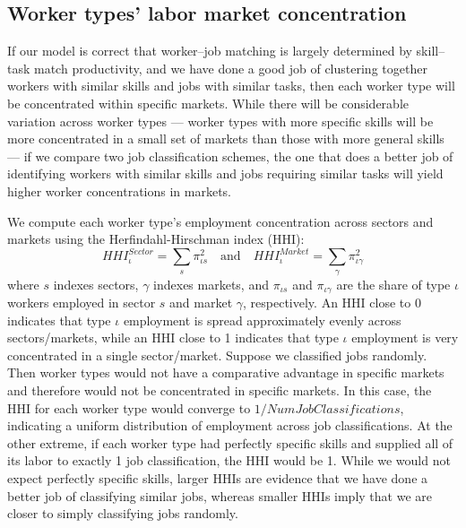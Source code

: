 \documentclass[12pt]{article}
\def\g{\gamma}
\def\i{\iota}
\theoremstyle{definition}
\theoremstyle{plain}
\begin{document}
\subsection{Worker types' labor market concentration}


\label{sec:hhi}

If our model is correct that worker--job matching is largely determined by skill--task match productivity, and we have done a good job of clustering together workers with similar skills and jobs with similar tasks, then each worker type will be concentrated within specific markets. While there will be considerable variation across worker types --- worker types with more specific skills will be more concentrated in a small set of markets than those with more general skills --- if we compare two job classification schemes, the one that does a better job of identifying workers with similar skills and jobs requiring similar tasks will yield higher worker concentrations in markets.


We compute each worker type's employment concentration across sectors and markets using the Herfindahl-Hirschman index (HHI): 
\[ HHI_{\i}^{Sector} = \sum_s \pi_{\i s}^2 \quad \text{and} \quad  HHI_{\i}^{Market} = \sum_\g \pi_{\i \g}^2 \]
where $s$ indexes sectors, $\g$ indexes markets, and $\pi_{\i s}$ and $\pi_{\i \g}$ are the share of type $\i$ workers employed in sector $s$ and market $\g$, respectively. An HHI close to 0 indicates that type $\i$ employment is spread approximately evenly across sectors/markets, while an HHI close to 1 indicates that type $\i$ employment is very concentrated in a single sector/market. Suppose we classified jobs randomly. Then worker types would not have a comparative advantage in specific markets and therefore would not be concentrated in specific markets. In this case, the HHI for each worker type would converge to $1/NumJobClassifications$, indicating a uniform distribution of employment across job classifications. At the other extreme, if each worker type had perfectly specific skills and supplied all of its labor to exactly 1 job classification, the HHI would be 1. While we would not expect perfectly specific skills,  larger HHIs are evidence that we have done a better job of classifying similar jobs, whereas smaller HHIs imply that we are closer to simply classifying jobs randomly. 
\end{document}
